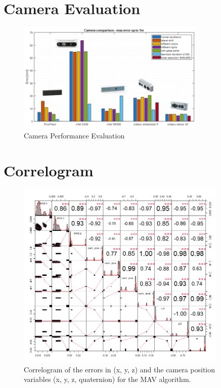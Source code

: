 \newpage
\section{Camera Evaluation}
\label{appendix:camera_evaluation}

\begin{figure}[h]
        \centering
        \includegraphics[width=0.8\textwidth]{images/camera_choice.png}
        \caption{Camera Performance Evaluation}
        \label{fig:camera_choice}
    \end{figure}
  
  
  
\newpage
\section{Correlogram}  
\label{appendix:correlogram}
\begin{figure}[h]
        \centering
        \includegraphics[width=0.9\textwidth]{images/r_correlogram.png}
        \caption{Correlogram of the errors in (x, y, z) and the camera position variables (x, y, z, quaternion) for the MAV algorithm.}
        \label{fig:correlogram}
\end{figure}
